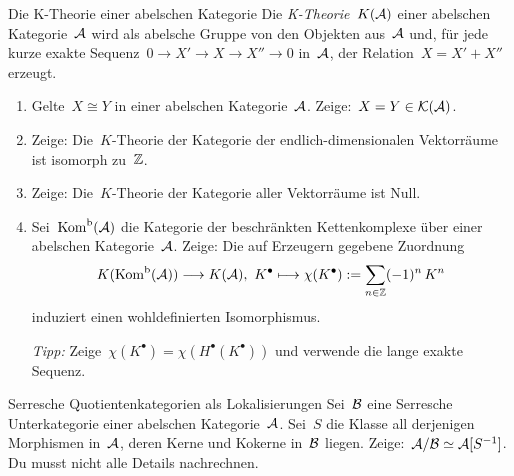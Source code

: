\documentclass{uebblatt}
\begin{document}
\begin{aufgabe}{Die K-Theorie einer abelschen Kategorie}
Die \emph{K-Theorie}~$K(\mathcal{A})$ einer abelschen Kategorie~$\mathcal{A}$ wird als abelsche
Gruppe von den Objekten aus~$\mathcal{A}$ und, für jede kurze exakte
Sequenz~$0 \to X' \to X \to X'' \to 0$ in~$\mathcal{A}$, der Relation~$X = X' + X''$ erzeugt.

\begin{enumerate}
\item Gelte~$X \cong Y$ in einer abelschen Kategorie~$\mathcal{A}$. Zeige:~$X = Y \in \mathcal{K}(\mathcal{A})$.
\item Zeige: Die~$K$-Theorie der Kategorie der endlich-dimensionalen Vektorräume
ist isomorph zu~$\mathbb{Z}$.
\item Zeige: Die~$K$-Theorie der Kategorie aller Vektorräume ist Null.
\item Sei~$\mathrm{Kom}^\mathrm{b}(\mathcal{A})$ die Kategorie der beschränkten Kettenkomplexe über einer
abelschen Kategorie~$\mathcal{A}$. Zeige: Die auf Erzeugern gegebene Zuordnung
\[ K(\mathrm{Kom}^\mathrm{b}(\mathcal{A})) \longrightarrow K(\mathcal{A}),\ K^\bullet \longmapsto
  \chi(K^\bullet) := \sum_{n \in \mathbb{Z}} (-1)^n \, K^n \]
induziert einen wohldefinierten Isomorphismus.

\emph{Tipp:} Zeige~$\chi(K^\bullet) = \chi(H^\bullet(K^\bullet))$ und verwende
die lange exakte Sequenz.
\end{enumerate}
\end{aufgabe}

\begin{aufgabe}{Serresche Quotientenkategorien als Lokalisierungen}
Sei~$\mathcal{B}$ eine Serresche Unterkategorie einer abelschen Kategorie~$\mathcal{A}$. Sei~$S$
die Klasse all derjenigen Morphismen in~$\mathcal{A}$, deren Kerne und Kokerne in~$\mathcal{B}$
liegen. Zeige:~$\mathcal{A}/\mathcal{B} \simeq \mathcal{A}[S^{-1}]$.
Du musst nicht alle Details nachrechnen.
\end{aufgabe}
\end{document}
